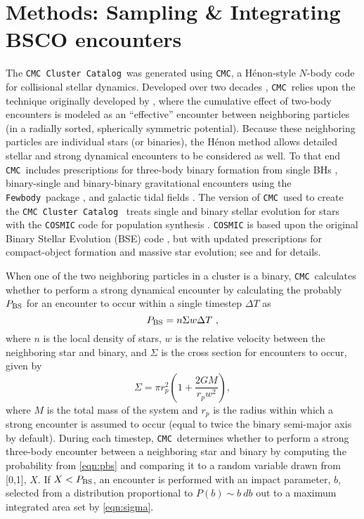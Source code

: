 \documentclass[twocolumn]{aastex631}
\newcommand{\CMC}{\texttt{CMC}}
\newcommand{\CMCcat}{\texttt{CMC Cluster Catalog}}
\newcommand{\fewbody}{\texttt{Fewbody}}
\begin{document}
\section{Methods: Sampling \& Integrating BSCO encounters} \label{sec:methods}

The \CMCcat\ was generated using \CMC, a H\'enon-style $N$-body code for collisional stellar dynamics.  Developed over two decades \citep{2000ApJ...540..969J,2013ApJS..204...15P,Rodriguez2022}, \CMC\ relies upon the technique originally developed by \citet{1971Ap&SS..13..284H,1971Ap&SS..14..151H}, where the cumulative effect of two-body encounters is modeled as an ``effective'' encounter between neighboring particles (in a radially sorted, spherically symmetric  potential).  Because these neighboring particles are individual stars (or binaries), the H\'enon method allows detailed stellar and strong dynamical encounters to be considered as well. To that end \CMC~includes prescriptions for three-body binary formation from single BHs \citep{2013ApJ...763L..15M}, binary-single and binary-binary gravitational encounters using the \fewbody\ package \citep{2004MNRAS.352....1F,2007ApJ...658.1047F}, and galactic tidal fields \citep{2013MNRAS.429.2881C}.  The version of \CMC\ used to create the \CMCcat~\citep[which used identical physics to the public version described in][]{Rodriguez2022} treats single and binary stellar evolution for stars with  the \texttt{COSMIC} code for population synthesis \citep{2020ApJ...898...71B}.  \texttt{COSMIC} is based upon the original Binary Stellar Evolution (BSE) code \citep{2000MNRAS.315..543H,2002MNRAS.329..897H}, but with updated prescriptions for compact-object formation and massive star evolution; see \citet{2020ApJ...898...71B} and \citet{Rodriguez2022} for details.

When one of the two neighboring particles in a cluster is a binary, \CMC\ calculates whether to perform a strong dynamical encounter by calculating the probably $P_{\rm BS}$ for an encounter to occur within a single timestep $\Delta T$ as
\begin{equation}
P_{\rm BS} = n \Sigma w \Delta T~,
\label{eqn:pbs}
\end{equation}
where $n$ is the local density of stars, $w$ is the relative velocity between the neighboring star and binary, and $\Sigma$ is the cross section for encounters to occur, given by
\begin{equation}
\Sigma = \pi r_p^2 \left(1+\frac{2 G M}{r_p w^2}\right),
\label{eqn:sigma}
\end{equation}
where $M$ is the total mass of the system and $r_p$ is the radius within which a strong encounter is assumed to occur (equal to twice the binary semi-major axis by default).  
During each timestep, \CMC\ determines whether to perform a strong three-body encounter between a neighboring star and binary by computing the probability from \ref{eqn:pbs} and comparing it to a random variable drawn from [0,1], $X$.  If $X < P_{\rm BS}$, an encounter is performed with an impact parameter, $b$, selected from a distribution proportional to $P(b) \sim b~db$ out to a maximum integrated area set by \ref{eqn:sigma}.
\end{document}
